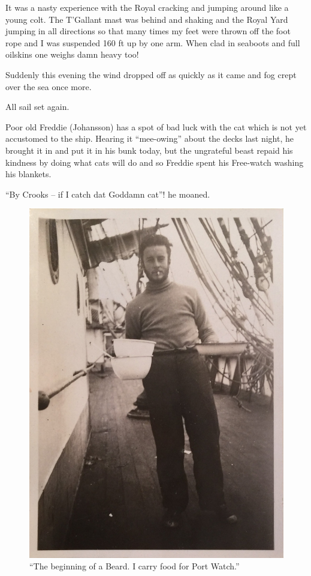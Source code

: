 \documentclass[
  11pt,
  msmallroyalvopaper
]{memoir}
\begin{document}
It was a nasty experience with the Royal cracking and jumping around
like a young colt. The T'Gallant mast was behind and shaking and the
Royal Yard jumping in all directions so that many times my feet were
thrown off the foot rope and I was suspended 160 ft up by one arm. When
clad in seaboots and full oilskins one weighs damn heavy too!

Suddenly this evening the wind dropped off as quickly as it came and fog
crept over the sea once more.

All sail set again.

Poor old Freddie (Johansson) has a spot of bad luck with the cat which
is not yet accustomed to the ship. Hearing it ``mee-owing'' about the
decks last night, he brought it in and put it in his bunk today, but the
ungrateful beast repaid his kindness by doing what cats will do and so
Freddie spent his Free-watch washing his blankets.

``By Crooks -- if I catch dat Goddamn cat''! he moaned.

\begin{figure}
\centering
\includegraphics{./images/image003.jpg}
\caption{``The beginning of a Beard. I carry food for Port Watch.''}
\end{figure}
\end{document}
